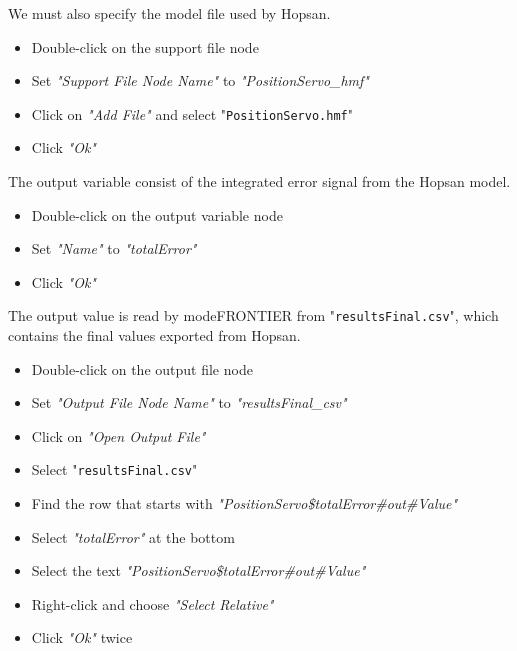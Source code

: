 \documentclass[a4paper]{article}
\begin{document}
\begin{tutenumerate}
We must also specify the model file used by Hopsan.
\begin{itemize}
\item Double-click on the support file node


\item Set \textit{"Support File Node Name"} to \textit{"PositionServo\_hmf"}
\item Click on \textit{"Add File"} and select "\texttt{PositionServo.hmf}"
\item Click \textit{"Ok"}
\end{itemize}

The output variable consist of the integrated error signal from the Hopsan model.
\begin{itemize}
\item Double-click on the output variable node


\item Set \textit{"Name"} to \textit{"totalError"}
\item Click \textit{"Ok"}
\end{itemize}

The output value is read by modeFRONTIER from "\texttt{resultsFinal.csv}", which contains the final values exported from Hopsan.
\begin{itemize}
\item Double-click on the output file node


\item Set \textit{"Output File Node Name"} to \textit{"resultsFinal\_csv"}
\item Click on \textit{"Open Output File"}
\item Select "\texttt{resultsFinal.csv}"
\item Find the row that starts with \textit{"PositionServo\$totalError\#out\#Value"}
\item Select \textit{"totalError"} at the bottom
\item Select the text \textit{"PositionServo\$totalError\#out\#Value"}
\item Right-click and choose \textit{"Select Relative"}
\item Click \textit{"Ok"} twice
\end{itemize}


\end{tutenumerate}
\end{document}
